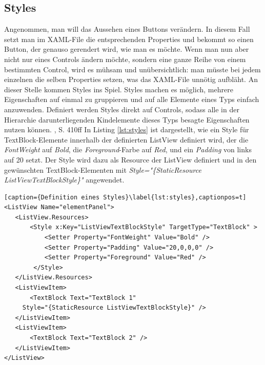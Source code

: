 \documentclass[a4paper,bibtotoc,oneside]{scrbook}
\begin{document}
\subsection[Styles]{Styles}\label{ref:styles}
Angenommen, man will das Aussehen eines Buttons verändern. In diesem Fall setzt man im XAML-File die entsprechenden Properties und bekommt so einen Button, der genauso gerendert wird, wie man es möchte.
\newline
Wenn man nun aber nicht nur eines Controls ändern möchte, sondern eine ganze Reihe von einem bestimmten Control, wird es mühsam und unübersichtlich: man müsste bei jedem einzelnen die selben Properties setzen, was das XAML-File unnötig aufbläht.
\newline
An dieser Stelle kommen Styles ins Spiel.
\newline
\newline
Styles machen es möglich, mehrere Eigenschaften auf einmal zu gruppieren und auf alle Elemente eines Typs einfach anzuwenden. Definiert werden Styles direkt auf Controls, sodass alle in der Hierarchie darunterliegenden Kindelemente dieses Typs besagte Eigenschaften nutzen können. \cite{ana12}, S. 410ff
\newline
\newline
In Listing \ref{lst:styles} ist dargestellt, wie ein Style für TextBlock-Elemente innerhalb der definierten ListView definiert wird, der die \textit{FontWeight} auf \textit{Bold}, die \textit{Foreground}-Farbe auf \textit{Red}, und ein \textit{Padding} von links auf 20 setzt.
\newline
Der Style wird dazu als Resource der ListView definiert und in den gewünschten TextBlock-Elementen mit \textit{Style="\{StaticResource ListViewTextBlockStyle\}"} angewendet.
\newline
\begin{lstlisting}[caption={Definition eines Styles}\label{lst:styles},captionpos=t]
<ListView Name="elementPanel">
   <ListView.Resources>
       <Style x:Key="ListViewTextBlockStyle" TargetType="TextBlock" >
           <Setter Property="FontWeight" Value="Bold" />
           <Setter Property="Padding" Value="20,0,0,0" />
           <Setter Property="Foreground" Value="Red" />                         
        </Style>
   </ListView.Resources>
   <ListViewItem>
       <TextBlock Text="TextBlock 1"
	 Style="{StaticResource ListViewTextBlockStyle}" />
   </ListViewItem>
   <ListViewItem>
       <TextBlock Text="TextBlock 2" />
   </ListViewItem>
</ListView>
\end{lstlisting}
\end{document}
